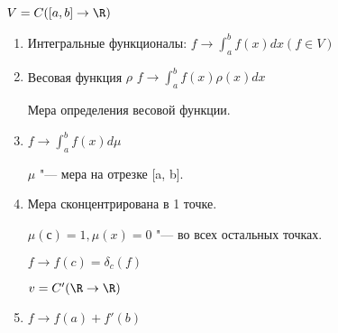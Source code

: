 \begin{exmp}
$V = C([a, b] \to \R)$

\begin{enumerate}
\item Интегральные функционалы:
$f \to \int_a^b f(x) dx (f \in V)$
\item Весовая функция $\rho$
$f \to \int_{a}^{b}f(x)\rho(x)dx$

Мера определения весовой функции.
\item $f \to \int_a^{b}f(x) d \mu$ 

$\mu$ "--- мера на отрезке [a, b].

\item  Мера сконцентрирована в 1 точке.

$\mu(с) = 1, \mu(x) = 0$ "--- во всех остальных точках.

$f \to f(c) = \delta_c(f)$

$v = C'(\R \to \R)$
\item $f \to f(a) + f'(b)$
\end{enumerate}
\end{exmp}